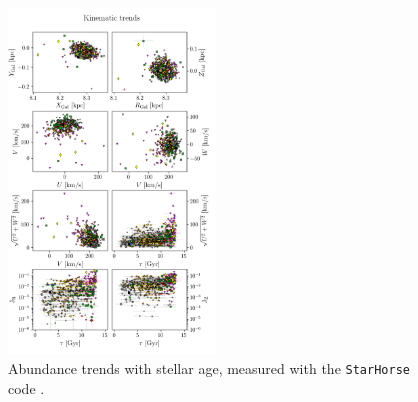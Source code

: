 \documentclass{aa}  %
\begin{document}
\begin{figure}\centering
 \includegraphics[width=0.49\textwidth]{im/harps_tsne-kin-abundsplot_teffcut.png}
\caption{Abundance trends with stellar age, measured with the \texttt{StarHorse} code \citep{Queiroz2017}.}
\label{harps2}
\end{figure}
\end{document}
